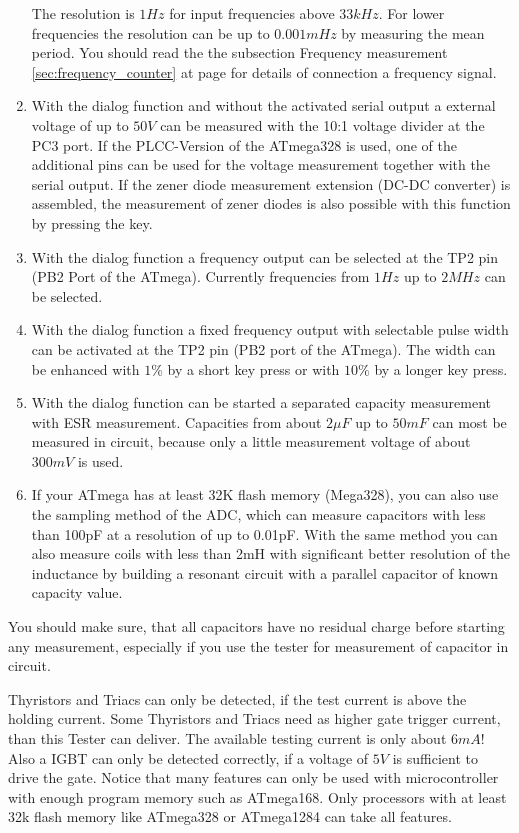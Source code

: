 \begin{enumerate}
The resolution is \(1Hz\) for input frequencies above \(33kHz\).
For lower frequencies the resolution can be up to \(0.001mHz\) by measuring the mean period.
You should read the the subsection Frequency measurement \ref{sec:frequency_counter} at page \pageref{sec:frequency_counter} 
for details of connection a frequency signal.
\item With the dialog function and without the activated serial output a external voltage of up to \(50V\) can be measured with
the 10:1 voltage divider at the PC3 port. If the PLCC-Version of the ATmega328 is used, one of the additional
pins can be used for the voltage measurement together with the serial output.
If the zener diode measurement extension (DC-DC converter) is assembled, the measurement of
zener diodes is also possible with this function by pressing the key.
\item With the dialog function a frequency output can be selected at the TP2 pin (PB2 Port of the ATmega).
Currently frequencies from \(1Hz\) up to \(2MHz\) can be selected.
\item With the dialog function a fixed frequency output with selectable pulse width can be activated at the TP2 pin
(PB2 port of the ATmega). The width can be enhanced with \(1\%\) by a short key press or with \(10\%\) by a longer key press.
\item With the dialog function can be started a separated capacity measurement with ESR measurement.
Capacities from about \(2\mu F\) up to \(50mF\) can most be measured in circuit, because only a little
measurement voltage of about \(300mV\) is used.
\item If your ATmega has at least 32K flash memory (Mega328), you can also use the sampling method of the ADC,
which can measure capacitors with less than 100pF at a resolution of up to 0.01pF.
With the same method you can also measure coils with less than 2mH with significant better resolution of the inductance
by building a resonant circuit with a parallel capacitor of known capacity value.

\end{enumerate}

You should make sure, that all capacitors have no residual charge before starting any measurement,
especially if you use the tester for measurement of capacitor in circuit.


Thyristors and Triacs can only be detected, if the test current is above the holding current.
Some Thyristors and Triacs need as higher gate trigger current, than this Tester can deliver.
The available testing current is only about \(6mA\)!
Also a IGBT can only be detected correctly, if a voltage of \(5V\) is sufficient to drive the gate.
Notice that many features can only be used with microcontroller with enough program memory such as ATmega168.
Only processors with at least 32k flash memory like ATmega328 or ATmega1284 can take all features.

